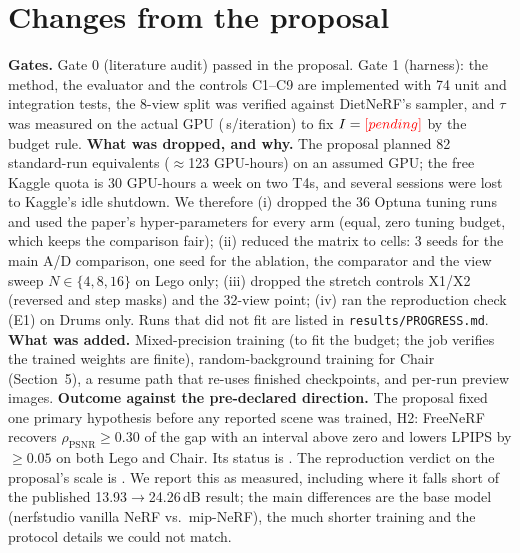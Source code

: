 \section{Changes from the proposal}\label{sec:changes}
\textbf{Gates.} Gate 0 (literature audit) passed in the proposal. Gate 1 (harness): the method, the evaluator and the controls C1--C9 are implemented with 74 unit and integration tests, the 8-view split was verified against DietNeRF's sampler, and $\tau$ was measured on the actual GPU (\SPerIter\,s/iteration) to fix $I=\textcolor{red}{[pending]}$ by the budget rule. \GateTwoText
\textbf{What was dropped, and why.} The proposal planned 82 standard-run equivalents ($\approx$123 GPU-hours) on an assumed GPU; the free Kaggle quota is 30 GPU-hours a week on two T4s, and several sessions were lost to Kaggle's idle shutdown. We therefore (i) dropped the 36 Optuna tuning runs and used the paper's hyper-parameters for every arm (equal, zero tuning budget, which keeps the comparison fair); (ii) reduced the matrix to \NumCells{} cells: 3 seeds for the main A/D comparison, one seed for the ablation, the comparator and the view sweep $N\in\{4,8,16\}$ on Lego only; (iii) dropped the stretch controls X1/X2 (reversed and step masks) and the 32-view point; (iv) ran the reproduction check (E1) on Drums only. Runs that did not fit are listed in \texttt{results/PROGRESS.md}.
\textbf{What was added.} Mixed-precision training (to fit the budget; the job verifies the trained weights are finite), random-background training for Chair (Section~5), a resume path that re-uses finished checkpoints, and per-run preview images.
\textbf{Outcome against the pre-declared direction.} The proposal fixed one primary hypothesis before any reported scene was trained, H2: FreeNeRF recovers $\rho_\mathrm{PSNR}\ge0.30$ of the gap with an interval above zero and lowers LPIPS by $\ge0.05$ on both Lego and Chair. Its status is \textbf{\HTwoStatus}. The reproduction verdict on the proposal's scale is \emph{\ReproVerdict}. We report this as measured, including where it falls short of the published 13.93$\to$24.26\,dB result; the main differences are the base model (nerfstudio vanilla NeRF vs.\ mip-NeRF), the much shorter training and the protocol details we could not match.
